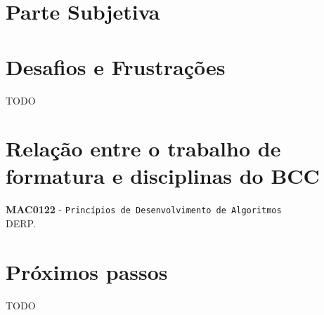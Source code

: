 \chapter*{Parte Subjetiva}
\label{sec:parte_subjetiva}

\chapter{Desafios e Frustrações}
\label{sec:desafios_frustracoes}


TODO


\chapter{Relação entre o trabalho de formatura e disciplinas do BCC}
\label{sec:relacao_disciplinas_bcc}
\newcommand\materia[3]{\noindent \textbf{#1} - \texttt{#2}\\\indent #3\vspace{0.5cm}\\}

\materia{MAC0122}{Princípios de Desenvolvimento de Algoritmos}{
    DERP.
}

\chapter{Próximos passos}
\label{sec:proximos_passos}

TODO

